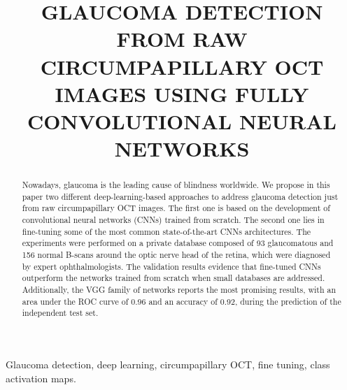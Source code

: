 \documentclass{article}
\title{GLAUCOMA DETECTION FROM RAW CIRCUMPAPILLARY OCT IMAGES USING FULLY CONVOLUTIONAL NEURAL NETWORKS}
\begin{document}
%
\maketitle
%
\begin{abstract}
Nowadays, glaucoma is the leading cause of blindness worldwide. We propose in this paper two different deep-learning-based approaches to address glaucoma detection just from raw circumpapillary OCT images. The first one is based on the development of convolutional neural networks (CNNs) trained from scratch. The second one lies in fine-tuning some of the most common state-of-the-art CNNs architectures. The experiments were performed on a private database composed of 93 glaucomatous and 156 normal B-scans around the optic nerve head of the retina, which were diagnosed by expert ophthalmologists. The validation results evidence that fine-tuned CNNs outperform the networks trained from scratch when small databases are addressed. Additionally, the VGG family of networks reports the most promising results, with an area under the ROC curve of 0.96 and an accuracy of 0.92, during the prediction of the independent test set.
\end{abstract}
%
\begin{keywords}
Glaucoma detection, deep learning, circumpapillary OCT, fine tuning, class activation maps.

\end{keywords}
%







\newpage


\balance


\end{document}
